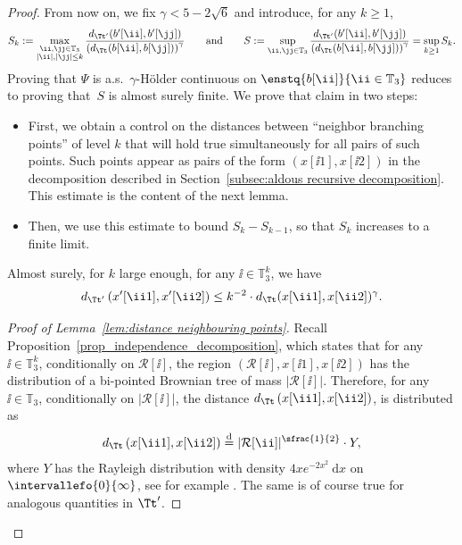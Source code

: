 \begin{proof}
From now on, we fix $\gamma < 5-2\sqrt{6}$ and introduce, for any $k\geq 1$,
\begin{align*}
S_k := \max_{\substack{\ii, \jj\in \mathbb{T}_3 \\ |\ii|, |\jj| \leq k}} \frac{d_{\Tt'}(b'[\ii],b'[\jj])}{ \left(d_{\Tt}(b[\ii],b[\jj])\right)^\gamma} \qquad \text{and} \qquad S := \sup_{\ii, \jj\in \mathbb{T}_3} \frac{d_{\Tt'}(b'[\ii],b'[\jj])}{ \left(d_{\Tt}(b[\ii],b[\jj])\right)^\gamma}= \sup_{k\geq 1} S_k.
\end{align*}
Proving that $\Psi$ is a.s.\ $\gamma$-Hölder continuous on $\enstq{b[\ii]}{ \ii\in \mathbb T_3}$ reduces to proving that~$S$ is almost surely finite.
We prove that claim in two steps:
\begin{itemize}
\item First, we obtain a control on the distances between ``neighbor branching points'' of level $k$ that will hold true simultaneously for all pairs of such points.
Such points appear as pairs of the form $(x[\ii1], x[\ii2])$ in the decomposition described in Section~\ref{subsec:aldous recursive decomposition}.
This estimate is the content of the next lemma.
\item Then, we use this estimate to bound $S_k-S_{k-1}$, so that $S_k$ increases to a finite limit.
\end{itemize}
\begin{lemma}\label{lem:distance neighbouring points}
Almost surely, for $k$ large enough, for any $\ii\in \mathbb{T}_3^k$, we have\vspace*{-3pt}
\begin{align}\label{eq:distance estimate for neighbouring points}
d_{\Tt'} \left( x'[\ii1],x'[\ii2] \right) \leq k^{-2}\cdot d_{\Tt}( x[\ii1],x[\ii2])^\gamma.
\end{align}
\end{lemma}
\begin{proof}[Proof of Lemma~\ref{lem:distance neighbouring points}]
Recall Proposition~\ref{prop_independence_decomposition}, which states that for any $\ii\in \mathbb{T}_3^k$, conditionally on $\mathcal{R}[\ii]$, the region $(\mathcal{R}[\ii], x[\ii1],x[\ii2])$ has the distribution of a bi-pointed Brownian tree of mass $|\mathcal{R}[\ii]|$. Therefore, for any $\ii\in \mathbb{T}_3$, conditionally on $|\mathcal{R}[\ii]|$, the distance $d_{\Tt} \left( x[\ii1],x[\ii2] \right)$, is distributed as\vspace*{-3pt}
\begin{align*}
d_{\Tt} \left( x[\ii1],x[\ii2] \right) \overset{\mathrm{d}}{=}|\mathcal{R}[\ii]|^{\sfrac{1}{2}} \cdot Y,
\end{align*}
where $Y$ has the Rayleigh distribution with density $4xe^{-2x^2}\ \mathrm{d}x$ on $\intervallefo{0}{\infty}$, see for example \cite[Th.\,2.11]{legall_random_2005}.
The same is of course true for analogous quantities in $\Tt'$.


\end{proof}
\end{proof}
